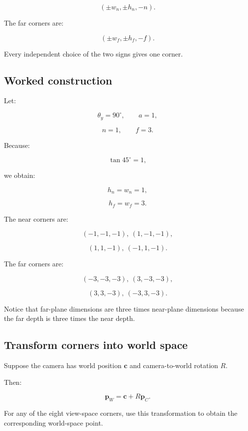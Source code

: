 \[
 \boxed{ (\pm w_n,\pm h_n,-n) }.
\]

The far corners are:

\[
 \boxed{ (\pm w_f,\pm h_f,-f) }.
\]

Every independent choice of the two signs gives one corner.

\subsection{Worked construction}\label{02-foundations-ii-ch034-worked-construction}

\hypertarget{02-foundations-ii-ch034-worked-construction}{}

Let:

\[
 \theta_y=90^\circ,\qquad a=1,
\]

\[
 n=1,\qquad f=3.
\]

Because:

\[
 \tan45^\circ=1,
\]

we obtain:

\[
 h_n=w_n=1,
\]

\[
 h_f=w_f=3.
\]

The near corners are:

\[
 (-1,-1,-1),\ (1,-1,-1),
\]

\[
 (1,1,-1),\ (-1,1,-1).
\]

The far corners are:

\[
 (-3,-3,-3),\ (3,-3,-3),
\]

\[
 (3,3,-3),\ (-3,3,-3).
\]

Notice that far-plane dimensions are three times near-plane dimensions because the far depth is three times the near depth.

\subsection{Transform corners into world space}\label{02-foundations-ii-ch034-transform-corners-into-world-space}

\hypertarget{02-foundations-ii-ch034-transform-corners-into-world-space}{}

Suppose the camera has world position \(\mathbf c\) and camera-to-world rotation \(R\).

Then:

\[
 \boxed{ \mathbf p_W=\mathbf c+R\mathbf p_C }.
\]

For any of the eight view-space corners, use this transformation to obtain the corresponding world-space point.

